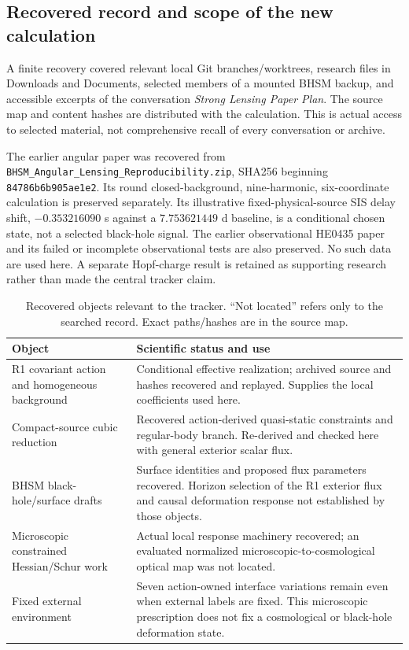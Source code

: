 \documentclass[11pt,a4paper]{article}
\begin{document}
\subsection{Recovered record and scope of the new calculation}

A finite recovery covered relevant local Git branches/worktrees, research
files in Downloads and Documents, selected members of a mounted BHSM
backup, and accessible excerpts of the conversation \emph{Strong Lensing
Paper Plan}. The source map and content hashes are distributed with the
calculation. This is actual access to selected material, not comprehensive
recall of every conversation or archive.

The earlier angular paper was recovered from
\texttt{BHSM\_Angular\_Lensing\_Reproducibility.zip}, SHA256 beginning
\texttt{84786b6b905ae1e2}. Its round closed-background, nine-harmonic,
six-coordinate calculation is preserved separately. Its illustrative
fixed-physical-source SIS delay shift, $-0.353216090$ s against a
$7.753621449$ d baseline, is a conditional chosen state, not a selected
black-hole signal. The earlier observational HE0435 paper and its failed
or incomplete observational tests are also preserved. No such data are
used here. A separate Hopf-charge result is retained as supporting
research rather than made the central tracker claim.

\begin{table}[t]
\centering\small
\caption{Recovered objects relevant to the tracker. ``Not located'' refers
only to the searched record. Exact paths/hashes are in the source map.}
\begin{tabular}{p{.28\linewidth}p{.63\linewidth}}
\toprule Object & Scientific status and use\\\midrule
R1 covariant action and homogeneous background & Conditional effective
realization; archived source and hashes recovered and replayed. Supplies
the local coefficients used here.\\
Compact-source cubic reduction & Recovered action-derived quasi-static
constraints and regular-body branch. Re-derived and checked here with
general exterior scalar flux.\\
BHSM black-hole/surface drafts & Surface identities and proposed flux
parameters recovered. Horizon selection of the R1 exterior flux and
causal deformation response not established by those objects.\\
Microscopic constrained Hessian/Schur work & Actual local response machinery
recovered; an evaluated normalized microscopic-to-cosmological optical
map was not located.\\
Fixed external environment & Seven action-owned interface variations
remain even when external labels are fixed. This microscopic prescription
does not fix a cosmological or black-hole deformation state.\\\bottomrule
\end{tabular}
\end{table}
\end{document}
